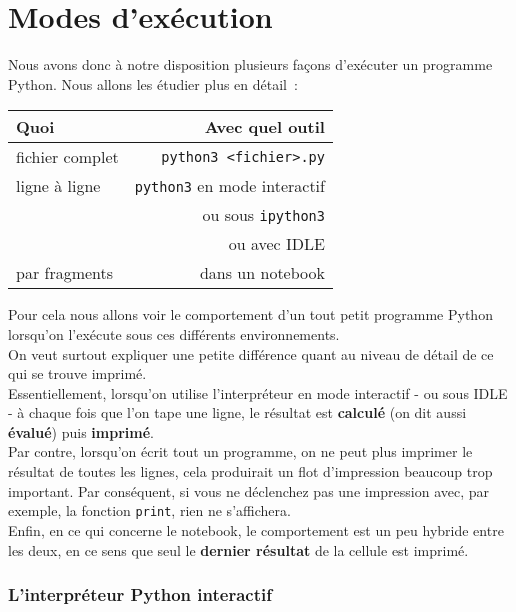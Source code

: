     \hypertarget{modes-dexuxe9cution}{%
\section{Modes d'exécution}\label{modes-dexuxe9cution}}

    Nous avons donc à notre disposition plusieurs façons d'exécuter un
programme Python. Nous allons les étudier plus en détail~:

    \begin{longtable}[]{@{}lr@{}}
\toprule
Quoi & Avec quel outil\tabularnewline
\midrule
\endhead
fichier complet &
\texttt{python3\ \textless{}fichier\textgreater{}.py}\tabularnewline
ligne à ligne & \texttt{python3} en mode interactif\tabularnewline
~ & ou sous \texttt{ipython3}\tabularnewline
~ & ou avec IDLE\tabularnewline
par fragments & dans un notebook\tabularnewline
\bottomrule
\end{longtable}

    Pour cela nous allons voir le comportement d'un tout petit programme
Python lorsqu'on l'exécute sous ces différents environnements.\\

On veut surtout expliquer une petite différence quant au niveau de
détail de ce qui se trouve imprimé.\\

    Essentiellement, lorsqu'on utilise l'interpréteur en mode interactif -
ou sous IDLE - à chaque fois que l'on tape une ligne, le résultat est
\textbf{calculé} (on dit aussi \textbf{évalué}) puis \textbf{imprimé}.\\

Par contre, lorsqu'on écrit tout un programme, on ne peut plus imprimer
le résultat de toutes les lignes, cela produirait un flot d'impression
beaucoup trop important. Par conséquent, si vous ne déclenchez pas une
impression avec, par exemple, la fonction \texttt{print}, rien ne
s'affichera.\\

Enfin, en ce qui concerne le notebook, le comportement est un peu
hybride entre les deux, en ce sens que seul le \textbf{dernier résultat}
de la cellule est imprimé.

    \hypertarget{linterpruxe9teur-python-interactif}{%
\subsubsection{L'interpréteur Python
interactif}\label{linterpruxe9teur-python-interactif}}

